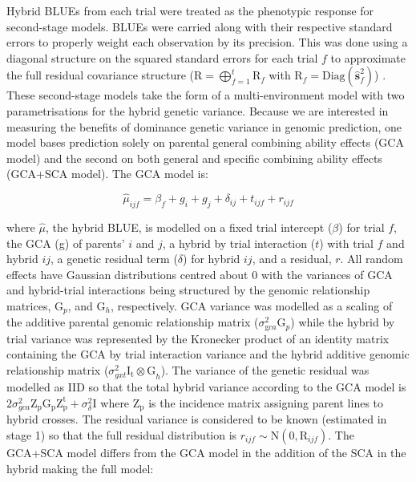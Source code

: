 Hybrid BLUEs from each trial were treated as the phenotypic response for second-stage models. BLUEs were carried along with their respective standard errors to properly weight each observation by its precision. This was done using a diagonal structure on the squared standard errors for each trial \(f\) to approximate the full residual covariance structure (\(\mathrm{R} = \bigoplus_{f=1}^{t} \mathrm{R}_f\) with \(\mathrm{R}_f = \mathrm{Diag}(\hat{\mathbf{s}}_f^2)\)) \cite{Frensham1997, Mohring2009}. These second-stage models take the form of a multi-environment model with two parametrisations for the hybrid genetic variance. Because we are interested in measuring the benefits of dominance genetic variance in genomic prediction, one model bases prediction solely on parental general combining ability effects (GCA model) and the second on both general and specific combining ability effects (GCA+SCA model). The GCA model is:

\begin{equation}
 \hat{\mu}_{ijf} =  \beta_f + g_i+g_j+\delta_{ij}+t_{ijf}+r_{ijf}
\label{eq:gca}
\end{equation}

where \(\hat{\mu}\), the hybrid BLUE, is modelled on a fixed trial intercept (\(\beta\)) for trial \(f\), the GCA (g) of parents' \(i\) and \(j\), a hybrid by trial interaction (\(t\)) with trial \(f\) and hybrid \(ij\), a genetic residual term (\(\delta\)) for hybrid \(ij\), and a residual, \(r\). All random effects have Gaussian distributions centred about 0 with the variances of GCA and hybrid-trial interactions being structured by the genomic relationship matrices, \(\mathrm G_p\), and \(\mathrm G_h\), respectively. GCA variance was modelled as a scaling of the additive parental genomic relationship matrix (\(\sigma^2_{\mathrm gca}\mathrm{G}_p\)) while the hybrid by trial variance was represented by the Kronecker product of an identity matrix containing the GCA by trial interaction variance and the hybrid additive genomic relationship matrix (\(\sigma^2_{gxt} \mathrm{I_t \otimes G}_h\)). The variance of the genetic residual was modelled as IID so that the total hybrid variance according to the GCA model is \(2\sigma^2_{gca} \mathrm {Z_pG_pZ^t_p} +\sigma^2_{\delta}\mathrm I\) where \(\mathrm{Z_p}\) is the incidence matrix assigning parent lines to hybrid crosses. The residual variance is considered to be known (estimated in stage 1) so that the full residual distribution is \(r_{ijf}\sim\mathrm{N}(0,\mathrm R_{ijf})\). The GCA+SCA model differs from the GCA model in the addition of the SCA in the hybrid making the full model:

